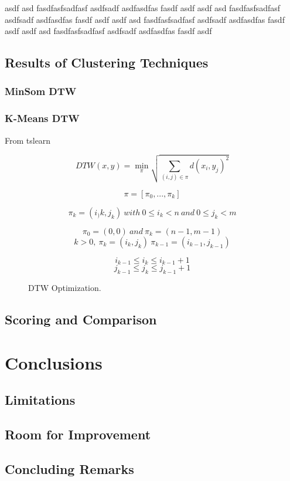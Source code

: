 \documentclass[12pt]{article}
\begin{document}
asdf asd fasdfasfsadfasf asdfsadf asdfasdfas fasdf asdf
asdf asd fasdfasfsadfasf asdfsadf asdfasdfas fasdf asdf
asdf asd fasdfasfsadfasf asdfsadf asdfasdfas fasdf asdf
asdf asd fasdfasfsadfasf asdfsadf asdfasdfas fasdf asdf

\subsection{Results of Clustering Techniques}
\subsubsection{MinSom DTW}
\subsubsection{K-Means DTW}

From tslearn \cite{dtwlearn}
\begin{figure}[H]
\caption{DTW Optimization.}
\centering

\[ DTW(x, y) = \min_{\pi} \sqrt{\sum_{(i,j) \in {\pi} }{d(x_i,y_j) }^2} \] 

\[ \pi = [\pi_0,...,\pi_k] \] 


\[ \pi_k = (i_)k,j_k)\ with\ 0 \leqslant i_k < n\ and\ 0 \leqslant j_k < m\]

\[\pi_0 = (0,0)\ and\ \pi_k=(n-1,m-1)\]
\[k>0,\ \pi_k=(i_k,j_k)\ \pi_{k-1}=(i_{k-1},j_{k-1})\]

\[i_{k-1} \leqslant i_k \leqslant i_{k-1} + 1\]
\[j_{k-1} \leqslant j_k \leqslant j_{k-1} + 1\]
\end{figure}



\subsection{Scoring and Comparison}

 
\section{Conclusions}
\subsection{Limitations}
\subsection{Room for Improvement}
\subsection{Concluding Remarks}
\end{document}
